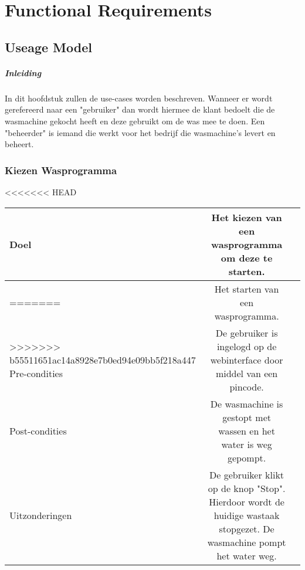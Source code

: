 \chapter{Functional Requirements}
\section{Useage Model}

\paragraph{Inleiding}
In dit hoofdstuk zullen de use-cases worden beschreven.
Wanneer er wordt gerefereerd naar een "gebruiker" dan wordt hiermee de klant bedoelt die de wasmachine gekocht heeft en deze gebruikt om de was mee te doen.
Een "beheerder" is iemand die werkt voor het bedrijf die wasmachine's levert en beheert.

\subsection{Kiezen Wasprogramma}
\begin{center}
<<<<<<< HEAD
  \begin{tabular}{ l | c | r | }
    \hline
    Doel & Het kiezen van een wasprogramma om deze te starten. \\ \hline
=======
  \begin{tabular}{ | p{4cm} | p{8.5cm} | }    \hline
    Doel & Het starten van een wasprogramma. \\ \hline
>>>>>>> b55511651ac14a8928e7b0ed94e09bb5f218a447
    Pre-condities & De gebruiker is ingelogd op de webinterface door middel van een pincode. \\ \hline
    Post-condities & De wasmachine is gestopt met wassen en het water is weg gepompt. \\ \hline
    Uitzonderingen & De gebruiker klikt op de knop "Stop". Hierdoor wordt de huidige wastaak stopgezet. De wasmachine pompt het water weg. \\
    \hline
  \end{tabular}
\end{center}

